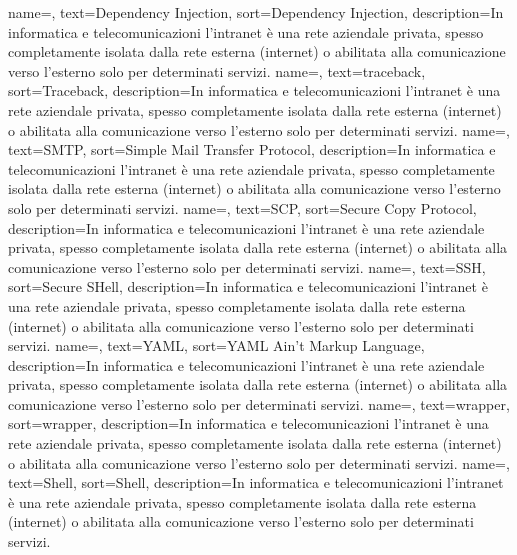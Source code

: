 {
	name=,
	text=Dependency Injection,
	sort=Dependency Injection,
	description={In informatica e telecomunicazioni l'intranet è una rete aziendale privata, spesso completamente isolata dalla rete esterna (internet) o abilitata alla comunicazione verso l'esterno solo per determinati servizi.}
}
{
	name=,
	text=traceback,
	sort=Traceback,
	description={In informatica e telecomunicazioni l'intranet è una rete aziendale privata, spesso completamente isolata dalla rete esterna (internet) o abilitata alla comunicazione verso l'esterno solo per determinati servizi.}
}
{
	name=,
	text=SMTP,
	sort=Simple Mail Transfer Protocol,
	description={In informatica e telecomunicazioni l'intranet è una rete aziendale privata, spesso completamente isolata dalla rete esterna (internet) o abilitata alla comunicazione verso l'esterno solo per determinati servizi.}
}
{
	name=,
	text=SCP,
	sort=Secure Copy Protocol,
	description={In informatica e telecomunicazioni l'intranet è una rete aziendale privata, spesso completamente isolata dalla rete esterna (internet) o abilitata alla comunicazione verso l'esterno solo per determinati servizi.}
}
{
	name=,
	text=SSH,
	sort=Secure SHell,
	description={In informatica e telecomunicazioni l'intranet è una rete aziendale privata, spesso completamente isolata dalla rete esterna (internet) o abilitata alla comunicazione verso l'esterno solo per determinati servizi.}
}
{
	name=,
	text=YAML,
	sort=YAML Ain't Markup Language,
	description={In informatica e telecomunicazioni l'intranet è una rete aziendale privata, spesso completamente isolata dalla rete esterna (internet) o abilitata alla comunicazione verso l'esterno solo per determinati servizi.}
}
{
	name=,
	text=wrapper,
	sort=wrapper,
	description={In informatica e telecomunicazioni l'intranet è una rete aziendale privata, spesso completamente isolata dalla rete esterna (internet) o abilitata alla comunicazione verso l'esterno solo per determinati servizi.}
}
{
	name=,
	text=Shell,
	sort=Shell,
	description={In informatica e telecomunicazioni l'intranet è una rete aziendale privata, spesso completamente isolata dalla rete esterna (internet) o abilitata alla comunicazione verso l'esterno solo per determinati servizi.}
}
